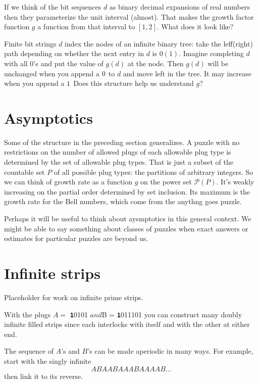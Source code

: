\documentclass[10pt]{article}
\numberwithin{equation}{section}
\newenvironment{anote}
               {{\textcolor{blue}{Note:}}
                 \itshape
               }
               {}
\newcommand{\plug}[1]{%
\mbox{{\textbf\texttt #1}}
}
\begin{document}
 If we think of the bit sequences $d$ as binary decimal expansions of real numbers then they parameterize the unit interval (almost). That makes the growth factor function $g$ a function from that interval to $[1,2]$. What does it look like?
 
 Finite bit strings $d$ index the nodes of an infinite binary tree: take the leff(right) path depending on whether the next entry in $d$ is $0(1)$. Imagine completing $d$ with all $0$'s and put the value of $g(d)$ at the node. Then $g(d)$ will be unchanged when you append a $\plug{0}$ to $d$ and move left in the tree. It may increase when you append a $\plug{1}$ Does this structure  help us understand $g$?


\section{Asymptotics}

Some of the structure in the preceding section generalizes. A puzzle with no restrictions on the number of allowed plugs of each allowable plug type is determined by the set  of allowable plug types. That is just a subset of the countable set $P$ of all possible plug types: the partitions of arbitrary integers. So we can think of growth rate as a function $g$ on the power set $\mathcal{P}(P)$. It's weakly increasing on the partial order determined by set inclusion. Its maximum is the growth rate for the Bell numbers, which come from the anythng goes puzzle.

\begin{anote}
Perhaps it will be useful to think about aysmptotics in this general context. We might be able to say something about classes of puzzles when exact answers or estimates for particular puzzles are beyond us.
\end{anote}
\section{Infinite strips}

\begin{anote}
Placeholder for work on infinite prime strips.
\end{anote}


With the plugs $A = $\plug{10101}$ and $B = \plug{1011101} you can construct many doubly infinite filled strips since each interlocks with itself and with the other at either end. 

The sequence of $A$'s and $B$'s can be made aperiodic in many ways. For example, start with the singly infinite
\begin{equation}
    ABAABAAABAAAAB\ldots
\end{equation}
then link it to its reverse.
\end{document}
